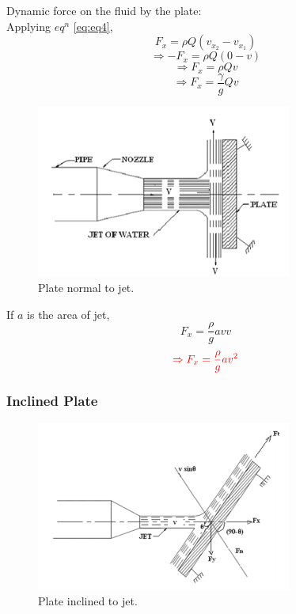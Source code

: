 \documentclass{article}
\begin{document}
Dynamic force on the fluid by the plate:
\\
Applying $eq^n$ \ref{eq:eq4}, 
$$F_x = \rho Q (v_{x_{2}} - v_{x_{1}}) $$
$$\Rightarrow -F_x = \rho Q (0-v)$$
\begin{equation}
	\Rightarrow F_x = \rho Q v \label{eq:eq5}
\end{equation}
\begin{equation}
	\Rightarrow F_x = \frac{\gamma}{g} Q v \label{eq:eq6}
\end{equation}

\begin{figure}[H]
  \centering
  \includegraphics[width=0.75\textwidth]{img/flat_plate.png}
  \caption{Plate normal to jet.}
  \label{fig:Plate normal to jet}
\end{figure}

If $a$ is the area of jet,
$$F_x = \frac{\rho}{g} a v  v$$
\begin{equation}
	\textcolor{red}{\Rightarrow F_x = \frac{\rho}{g} a v^2} \label{eq:eq7}
\end{equation}

\subsubsection{Inclined Plate}
\begin{figure}[H]
  \centering
  \includegraphics[width=0.75\textwidth]{img/inclined_plate.png}
  \caption{Plate inclined to jet.}
  \label{fig:Plate inclined to jet}
\end{figure}
\vspace{0.25cm}
\end{document}

